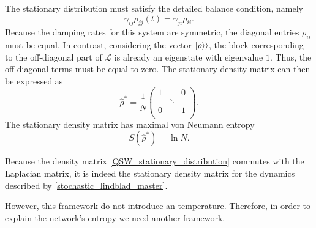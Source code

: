 The stationary distribution must satisfy the detailed balance condition, namely
\begin{equation}
    \gamma_{ij}\rho_{jj}(t) = \gamma_{ji}\rho_{ii}.
\end{equation}
Because the damping rates for this system are symmetric, the diagonal entries $\rho_{ii}$ must be  equal. 
In contrast, considering the vector $\lvert\rho\rangle\rangle$, the block corresponding to the off-diagonal part of $\mathcal{L}$ is already an eigenstate with eigenvalue $1$. Thus, the off-diagonal terms must be equal to zero.
The stationary density matrix can then be expressed as
\begin{equation}\label{QSW_stationary_distribution}
    \hat\rho^* = \frac{1}{N}\begin{pmatrix}
        1&&0\\
        &\ddots&\\
        0&&1\\
    \end{pmatrix}.
\end{equation}
The stationary density matrix has maximal von Neumann entropy 
\begin{equation}
    S\left(\hat\rho^*\right) = \ln N.
\end{equation}

Because the density matrix \eqref{QSW_stationary_distribution} commutes with the Laplacian matrix, it is indeed the stationary density matrix for the dynamics described by \eqref{stochastic_lindblad_master}.

However, this framework do not introduce an temperature. Therefore, in order to explain the network's entropy we need another framework.


\begin{comment}
    Instead, adding also the coherent part, we need to go in the basis $\{\ket{\lambda}\}$ eigenvector of $\hat L$. 
    The decoherent part becomes
    \begin{equation}
    \begin{split}
    \mathcal{L}^{cl}\ket{\lambda}\bra{\lambda} &= \sum_{ij}\gamma_{ij}\left[\hat J_{ij} \ket{\lambda}\bra{\lambda}\hat J_{ij}^\dagger -\frac{1}{2} \left\{ \hat J_{ij}^\dagger \hat J_{ij}, \ket{\lambda}\bra{\lambda}\right\}\right]\\
        &= \sum_{ij}\gamma_{ij}\left[\ket{i}\braket{j}{\lambda}\braket{\lambda}{j}\bra{i} -\frac{1}{2}\ket{j}\braket{i}{i}\braket{j}{\lambda}\bra{\lambda} - \frac{1}{2}\ket{\lambda}\braket{\lambda}{j}\braket{i}{i}\bra{j} \right]\\
        & = \sum_{ij}\gamma_{ij}\left[|\braket{j}{\lambda}|^2\ket{i}\bra{i} -\frac{1}{2}\ket{j}\braket{j}{\lambda}\bra{\lambda} - \frac{1}{2}\ket{\lambda}\braket{\lambda}{j}\bra{j} \right]\\
        &= \sum_{ij}\left[\pi_{ij}\rho_j\ket{i}\bra{i} -\frac{\pi_{ij}}{2}\braket{j}{\lambda}\ket{j}\bra{\lambda} - \frac{\pi_{ij}}{2}\braket{\lambda}{j}\ket{\lambda}\bra{j} \right]
    \end{split}
\end{equation}
\end{comment}

